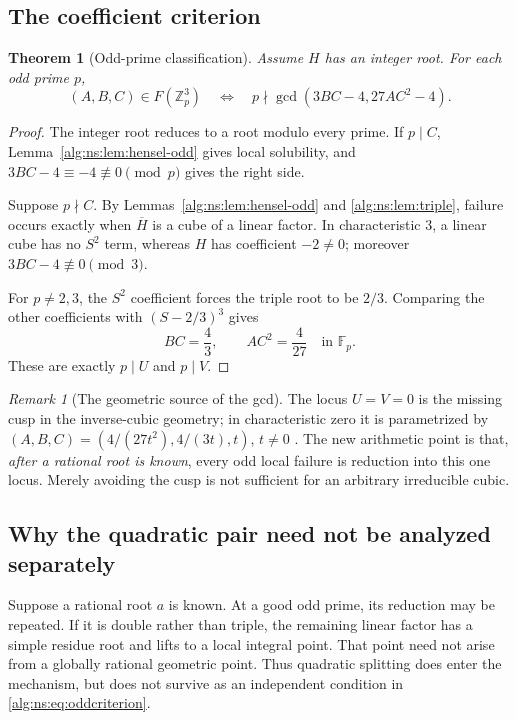 \documentclass[11pt]{article}
\numberwithin{equation}{section}
\newtheorem{theorem}{Theorem}[section]
\theoremstyle{plain}
\theoremstyle{plain}
\theoremstyle{plain}
\theoremstyle{definition}
\theoremstyle{definition}
\theoremstyle{definition}
\theoremstyle{remark}
\newtheorem{remark}[remark]{Remark}
\newcommand{\Z}{\mathbb Z}\newcommand{\Q}{\mathbb Q}
\newcommand{\F}{\mathbb F}\newcommand{\A}{\mathbb A}\newcommand{\PP}{\mathbb P}
\begin{document}
\subsection{The coefficient criterion}
\begin{theorem}[Odd-prime classification]\label{alg:ns:thm:odd}
Assume $H$ has an integer root. For each odd prime $p$,
\begin{equation}\label{alg:ns:eq:oddcriterion}
(A,B,C)\in F(\Z_p^3)
\quad\Longleftrightarrow\quad
p\nmid\gcd(3BC-4,27AC^2-4).
\end{equation}
\end{theorem}
\begin{proof}
The integer root reduces to a root modulo every prime. If $p\mid C$,
Lemma~\ref{alg:ns:lem:hensel-odd} gives local solubility, and
$3BC-4\equiv-4\not\equiv0\pmod p$ gives the right side.

Suppose $p\nmid C$. By Lemmas~\ref{alg:ns:lem:hensel-odd} and
\ref{alg:ns:lem:triple}, failure occurs exactly when $\overline H$ is a cube
of a linear factor. In characteristic $3$, a linear cube has no
$S^2$ term, whereas $H$ has coefficient $-2\ne0$; moreover
$3BC-4\not\equiv0\pmod3$.

For $p\ne2,3$, the $S^2$ coefficient forces the triple root to be
$2/3$. Comparing the other coefficients with $(S-2/3)^3$ gives
\[
BC=\frac43,\qquad AC^2=\frac4{27}
\quad\text{in }\F_p.
\]
These are exactly $p\mid U$ and $p\mid V$.
\end{proof}

\begin{remark}[The geometric source of the gcd]
The locus $U=V=0$ is the missing cusp in the inverse-cubic geometry;
in characteristic zero it is parametrized by
$(A,B,C)=(4/(27t^2),4/(3t),t)$, $t\ne0$ \cite{gao}.
The new arithmetic point is that, \emph{after a rational root is known},
every odd local failure is reduction into this one locus. Merely avoiding
the cusp is not sufficient for an arbitrary irreducible cubic.
\end{remark}

\subsection{Why the quadratic pair need not be analyzed separately}
Suppose a rational root $a$ is known. At a good odd prime, its reduction
may be repeated. If it is double rather than triple, the remaining
linear factor has a simple residue root and lifts to a local integral
point. That point need not arise from a globally rational geometric
point. Thus quadratic splitting does enter the mechanism, but does not
survive as an independent condition in \eqref{alg:ns:eq:oddcriterion}.
\end{document}
